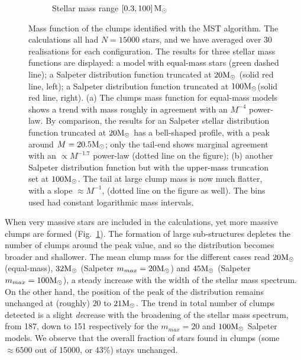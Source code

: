 \begin{figure}
\begin{subfigure}[b]{0.49\textwidth}
        \caption{Stellar mass range $[0.3, 100]\, {\textrm{M}_\odot}$}
        \label{Fig:2_ClumpMF_MF_2}
    \end{subfigure}
\caption[Clump mass functions for $m_{max} = 20~\Mo$ and $100~\Mo$]{Mass function of the clumps identified with the MST algorithm. The calculations all had $N = 15 000$ stars, and we have averaged over 30 realisations for each configuration.  The results for three stellar mass functions  are displayed: a model with equal-mass stars (green dashed line); a Salpeter distribution function truncated at $20 {\textrm{M}_\odot}$ (solid red line, left); a Salpeter distribution function truncated at $100 {\textrm{M}_\odot}$(solid red line, right). (a) The clumps  mass function for equal-mass models  shows a trend with mass roughly in agreement with an $M^{-4}$ power-law. By comparison,  the results for an  Salpeter stellar distribution function  truncated at $20 {\textrm{M}_\odot}$ has a bell-shaped profile, with a peak around $M = 20.5 {\textrm{M}_\odot}$; only the tail-end shows marginal agreement with an $\propto M^{-1.7}$ power-law (dotted line on the figure); (b) another Salpeter distribution function but with  the upper-mass truncation  set at $100 {\textrm{M}_\odot}$. The tail at large clump mass is now much flatter, with a slope $\approx M^{-1}$, (dotted line on the figure as well). The bins used  had constant logarithmic mass intervals.}
\label{Fig:2_ClumpMF_MF}
\end{figure}



When very massive stars are included in the calculations, yet more massive clumps are formed (Fig.~\ref{Fig:2_ClumpMF_MF_2}). The formation of large sub-structures depletes the number of clumps around the peak value, and so the distribution becomes broader and shallower. The mean clump mass for the different cases read $20 {\textrm{M}_\odot}$ (equal-mass), $32 {\textrm{M}_\odot}$ (Salpeter $m_{max} = 20 {\textrm{M}_\odot}$) and $45 {\textrm{M}_\odot}$ (Salpeter $m_{max} = 100 {\textrm{M}_\odot}$), a steady increase with the width of the stellar mass spectrum. On the other hand, the position of the peak of the distribution remains unchanged at (roughly) $20$ to $21{\textrm{M}_\odot}$. The trend in total number of clumps detected is a slight {\it de}crease with the broadening of the  stellar mass spectrum, from 187, down to 151 respectively for the $m_{max}=20$ and $100 {\textrm{M}_\odot}$ Salpeter models.  
  We observe that the overall fraction of  stars found in clumps (some $\approx 6500$ out of 15000, or 43\%) stays unchanged.
  
